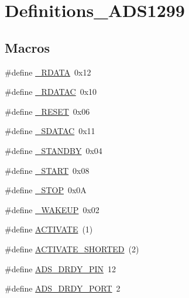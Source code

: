 \hypertarget{group__Definitions__ADS1299}{}\section{Definitions\+\_\+\+A\+D\+S1299}
\label{group__Definitions__ADS1299}
\subsection*{Macros}
\begin{DoxyCompactItemize}
\item 
\#define \hyperlink{group__Definitions__ADS1299_ga0902995cb5c5c4c46e34653033f74e08}{\+\_\+\+R\+D\+A\+TA}~0x12
\item 
\#define \hyperlink{group__Definitions__ADS1299_gab1c685ad3f69a4c28f19b19a13c725d0}{\+\_\+\+R\+D\+A\+T\+AC}~0x10
\item 
\#define \hyperlink{group__Definitions__ADS1299_gae0b867da2bcc6a8910ba93baec7380ec}{\+\_\+\+R\+E\+S\+ET}~0x06
\item 
\#define \hyperlink{group__Definitions__ADS1299_ga4f962a0b8818881f4dd33aeb8dedd5b2}{\+\_\+\+S\+D\+A\+T\+AC}~0x11
\item 
\#define \hyperlink{group__Definitions__ADS1299_gae75728a5fdc9a5761a4e9cd52d5c45a0}{\+\_\+\+S\+T\+A\+N\+D\+BY}~0x04
\item 
\#define \hyperlink{group__Definitions__ADS1299_ga484ccc8af4c825fd4897a25683e63745}{\+\_\+\+S\+T\+A\+RT}~0x08
\item 
\#define \hyperlink{group__Definitions__ADS1299_gabaa9184ccb1f6768e6f8b6b3e86e1b5e}{\+\_\+\+S\+T\+OP}~0x0A
\item 
\#define \hyperlink{group__Definitions__ADS1299_ga86c38abe57dc4854705d1ca395e65a54}{\+\_\+\+W\+A\+K\+E\+UP}~0x02
\item 
\#define \hyperlink{group__Definitions__ADS1299_gad37ed8e28abe573e992766b0e3b0353b}{A\+C\+T\+I\+V\+A\+TE}~(1)
\item 
\#define \hyperlink{group__Definitions__ADS1299_gadcee793b764f63895383331bffe29b1e}{A\+C\+T\+I\+V\+A\+T\+E\+\_\+\+S\+H\+O\+R\+T\+ED}~(2)
\item 
\#define \hyperlink{group__Definitions__ADS1299_ga154420761425fbc9f7b284f38b13aac8}{A\+D\+S\+\_\+\+D\+R\+D\+Y\+\_\+\+P\+IN}~12
\item 
\#define \hyperlink{group__Definitions__ADS1299_gab717e0a1f047ab6cef64378e7aaae614}{A\+D\+S\+\_\+\+D\+R\+D\+Y\+\_\+\+P\+O\+RT}~2
\item 

\end{DoxyCompactItemize}
